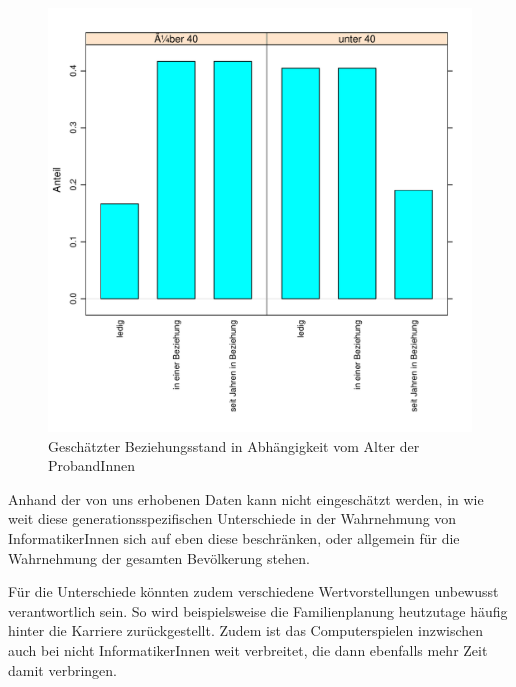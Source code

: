 \documentclass[de]{agse-empir-report}\usepackage[]{graphicx}\usepackage[]{color}
\newenvironment{knitrout}{}{} %
\begin{document}
\begin{figure}
\begin{knitrout}
\color{fgcolor}
\includegraphics[width=\linewidth]{figure/chart_age-beziehung-1} 

\end{knitrout}
    \caption{Gesch\"atzter Beziehungsstand in Abh\"angigkeit vom Alter der ProbandInnen}
    \label{fig:beziehung_alter}
\end{figure}

Anhand der von uns erhobenen Daten kann nicht eingesch\"atzt werden, in wie weit diese generationsspezifischen Unterschiede in der Wahrnehmung von InformatikerInnen sich auf eben diese beschr\"anken, oder allgemein f\"ur die Wahrnehmung der gesamten Bev\"olkerung stehen.

F\"ur die Unterschiede k\"onnten zudem verschiedene Wertvorstellungen unbewusst verantwortlich sein. So wird beispielsweise die Familienplanung heutzutage h\"aufig hinter die Karriere zur\"uckgestellt. Zudem ist das Computerspielen inzwischen auch bei nicht InformatikerInnen weit verbreitet, die dann ebenfalls mehr Zeit damit verbringen.
\end{document}
